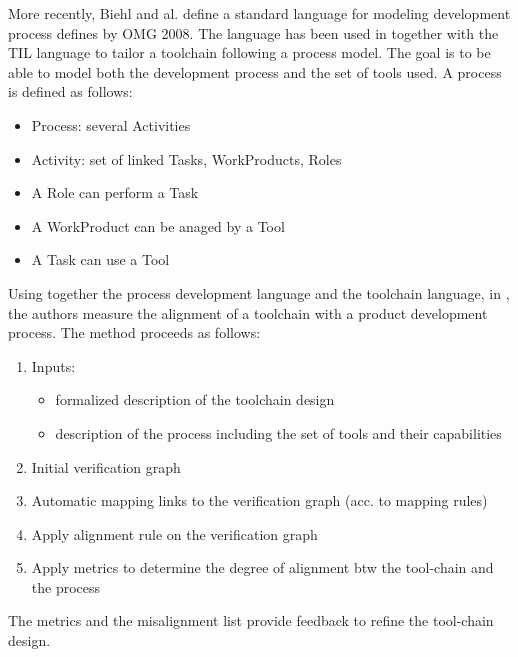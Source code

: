 More recently, Biehl and al.  define a standard language for modeling
development process defines by OMG 2008. The language has been used in
\cite{biehl_constructing_2012,biehl_early_2012} together with the TIL
language to tailor a toolchain following a process model. The goal is
to be able to model both the development process and the set of tools
used.  A process is defined as follows:
\begin{itemize}
\item Process: several Activities
\item Activity: set of linked Tasks, WorkProducts, Roles
\item A Role can perform a Task
\item A WorkProduct can be anaged by a Tool
\item A Task can use a Tool
\end{itemize}
Using together the process development language  and the toolchain
language, in \cite{biehl_early_2012}, the authors  measure the alignment of a toolchain
with a product development process. The method proceeds as follows:
\begin{enumerate}
\item Inputs:
  \begin{itemize}
  \item formalized description of the toolchain design
  \item description of the process including the set of tools and their capabilities
  \end{itemize}
\item Initial verification graph
\item Automatic mapping links to the verification graph (acc. to mapping rules)
\item Apply alignment rule on the verification graph
\item Apply metrics to determine the degree of alignment btw the tool-chain and the
   process
\end{enumerate}
The metrics and the misalignment list provide feedback to refine the tool-chain
design.



